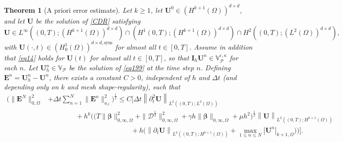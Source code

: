 \documentclass[10pt,a4paper]{amsart}
\newtheorem{theorem}{Theorem}
\newcommand\bE{\mathbf{E}}
\newcommand\bU{\mathbf{U}}
\newcommand\bbeta{{\boldsymbol{\beta}}}
\newcommand\calP{{\mathcal{P}}}
\begin{document}
\begin{theorem}[A priori error estimate]
  \label{Theorem11}
	Let $k\ge 1$, let $\bU^{0}\in \left(H^{k+1}(\Omega)\right)^{d\times d}$, and let $\bU$ be the solution of \eqref{CDR} satisfying
	\[
	\bU\in  L^{\infty}((0,T);(H^{k+1}(\Omega))^{d\times d})\cap (H^{1}(0,T);(H^{k+1}(\Omega))^{d\times d})\cap H^{2}((0,T);(L^{2}(\Omega))^{d\times d}),
	\]
	with $\bU(\cdot,t)\in (H^{1}_{0}(\Omega))^{d\times d,\textrm{sym}}$ for almost all $t\in [0,T]$.
	Assume in addition that \eqref{eq14} holds for $\bU(t)$ for almost all $t\in[0,T]$, so that $\mathbf I_h\bU^n\in\mathbb V_{\calP}^{\epsilon,\kappa}$ for each $n$.
	Let $\bU_{h}^{n}\in \mathbb{V}_{\calP}$ be the solution of \eqref{eq199} 
	at the time step $n$.
	Defining $\bE^{n}=\bU^{n}_{h}-\bU^{n}$, there exists a constant $C>0$,  independent of $h$ and $\Delta t$ (and depending only on $k$ and mesh shape-regularity), such that
\begin{equation}
	\begin{aligned}
		\Big( \|\bE^N \|_{0,\Omega}^2&+\Delta t\sum_{n=1}^{N}\|\bE^n \|_{a_{J}}^2 \Big)^{\frac{1}{2}}
		\leq C\Bigg[ \Delta t \left\|	\partial_{t}^{2}\mathbf{U} \right\|_{L^{2}((0,T);L^{2}(\Omega))} \\
		&\qquad\qquad+ h^{k}\Big(\big(T\|\bbeta\|_{0,\infty,\Omega}^{2}+\|\mathcal{D}^{\frac{1}{2}}\|_{0,\infty,\Omega}^{2}+\gamma h\|\bbeta\|_{0,\infty,\Omega}+\mu h^{2}\big)^{\frac{1}{2}}
		\left\|	\mathbf{U} \right\|_{L^{2}((0,T);H^{k+1}(\Omega))}\\
			&\qquad\qquad\qquad\qquad\qquad\qquad
			+h\Big(\left\|\partial_{t}\mathbf{U} \right\|_{L^{2}((0,T);H^{k+1}(\Omega))}+ \max\limits_{1\leq n\leq N}|\bU^{n} |_{k+1,\Omega}\Big)\Big)\Bigg].
	\end{aligned}
\end{equation}
\end{theorem}
\end{document}

